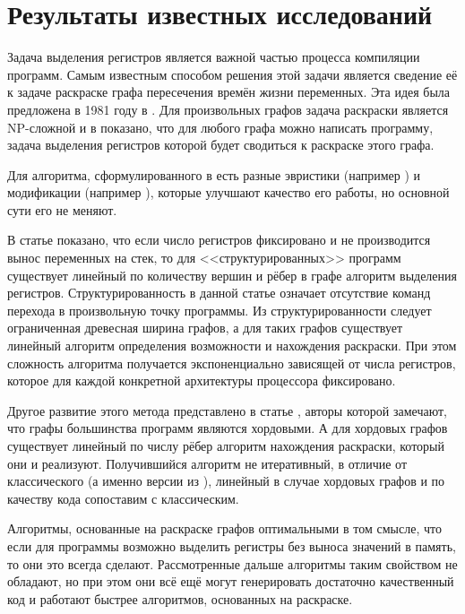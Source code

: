 \documentclass[a4paper,14pt]{extarticle}
\begin{document}
\section{Результаты известных исследований}

Задача выделения регистров является важной частью процесса компиляции программ.
Самым известным способом решения этой задачи является сведение её к задаче раскраске графа пересечения времён жизни переменных.
Эта идея была предложена в 1981 году в \cite{chaitin_register_1981}.
Для произвольных графов задача раскраски является NP-сложной и в \cite{chaitin_register_1981} показано,
что для любого графа можно написать программу, задача выделения регистров которой будет сводиться к раскраске этого графа.

Для алгоритма, сформулированного в \cite{chaitin_register_1981} есть разные эвристики (например \cite{briggs_rematerialization_1992})
и модификации (например \cite{george_iterated_1996}), которые улучшают качество его работы, но основной сути его не меняют.

В статье \cite{hans_l_bodlaender_linear-time_1997} показано, что если число регистров фиксировано и не производится вынос переменных на стек,
то для <<структурированных>> программ существует линейный по количеству вершин и рёбер в графе алгоритм выделения регистров.
Структурированность в данной статье означает отсутствие команд перехода в произвольную точку программы.
Из структурированности следует ограниченная древесная ширина графов,
а для таких графов существует линейный алгоритм определения возможности и нахождения раскраски.
При этом сложность алгоритма получается экспоненциально зависящей от числа регистров,
которое для каждой конкретной архитектуры процессора фиксировано.

Другое развитие этого метода представлено в статье \cite{hutchison_register_2005}, 
авторы которой замечают, что графы большинства программ являются хордовыми.
А для хордовых графов существует линейный по числу рёбер алгоритм нахождения раскраски, который они и реализуют. 
Получившийся алгоритм не итеративный, в отличие от классического (а именно версии из \cite{george_iterated_1996}),
линейный в случае хордовых графов и по качеству кода сопоставим с классическим.

Алгоритмы, основанные на раскраске графов оптимальными в том смысле,
что если для программы возможно выделить регистры без выноса значений в память, то они это всегда сделают.
Рассмотренные дальше алгоритмы таким свойством не обладают, но при этом они всё ещё могут генерировать достаточно качественный код
и работают быстрее алгоритмов, основанных на раскраске.
\end{document}
